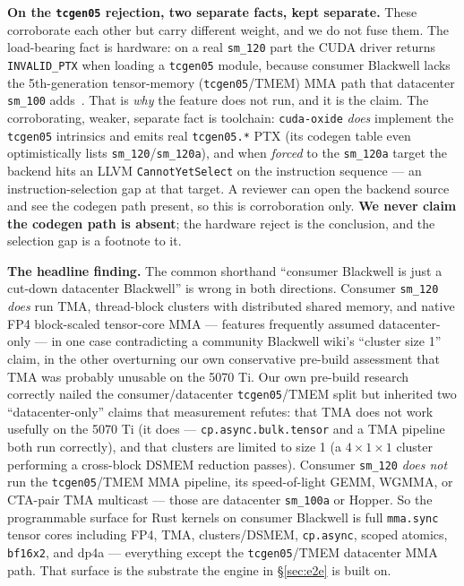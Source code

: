 \documentclass[11pt]{article}
\begin{document}
\textbf{On the \texttt{tcgen05} rejection, two separate facts, kept separate.} These corroborate each other but carry different weight, and we do not fuse them. The load-bearing fact is hardware: on a real \texttt{sm\_120} part the CUDA driver returns \texttt{INVALID\_PTX} when loading a \texttt{tcgen05} module, because consumer Blackwell lacks the 5th-generation tensor-memory (\texttt{tcgen05}/TMEM) MMA path that datacenter \texttt{sm\_100} adds~\citep{ptxisa}. That is \emph{why} the feature does not run, and it is the claim. The corroborating, weaker, separate fact is toolchain: \texttt{cuda-oxide} \emph{does} implement the \texttt{tcgen05} intrinsics and emits real \texttt{tcgen05.*} PTX (its codegen table even optimistically lists \texttt{sm\_120}/\texttt{sm\_120a}), and when \emph{forced} to the \texttt{sm\_120a} target the backend hits an LLVM \texttt{CannotYetSelect} on the instruction sequence --- an instruction-selection gap at that target. A reviewer can open the backend source and see the codegen path present, so this is corroboration only. \textbf{We never claim the codegen path is absent}; the hardware reject is the conclusion, and the selection gap is a footnote to it.

\textbf{The headline finding.} The common shorthand ``consumer Blackwell is just a cut-down datacenter Blackwell'' is wrong in both directions. Consumer \texttt{sm\_120} \emph{does} run TMA, thread-block clusters with distributed shared memory, and native FP4 block-scaled tensor-core MMA --- features frequently assumed datacenter-only --- in one case contradicting a community Blackwell wiki's ``cluster size 1'' claim, in the other overturning our own conservative pre-build assessment that TMA was probably unusable on the 5070 Ti. Our own pre-build research correctly nailed the consumer/datacenter \texttt{tcgen05}/TMEM split but inherited two ``datacenter-only'' claims that measurement refutes: that TMA does not work usefully on the 5070 Ti (it does --- \texttt{cp.async.bulk.tensor} and a TMA pipeline both run correctly), and that clusters are limited to size 1 (a $4\times1\times1$ cluster performing a cross-block DSMEM reduction passes). Consumer \texttt{sm\_120} \emph{does not} run the \texttt{tcgen05}/TMEM MMA pipeline, its speed-of-light GEMM, WGMMA, or CTA-pair TMA multicast --- those are datacenter \texttt{sm\_100a} or Hopper. So the programmable surface for Rust kernels on consumer Blackwell is full \texttt{mma.sync} tensor cores including FP4, TMA, clusters/DSMEM, \texttt{cp.async}, scoped atomics, \texttt{bf16x2}, and dp4a --- everything except the \texttt{tcgen05}/TMEM datacenter MMA path. That surface is the substrate the engine in \S\ref{sec:e2e} is built on.
\end{document}
